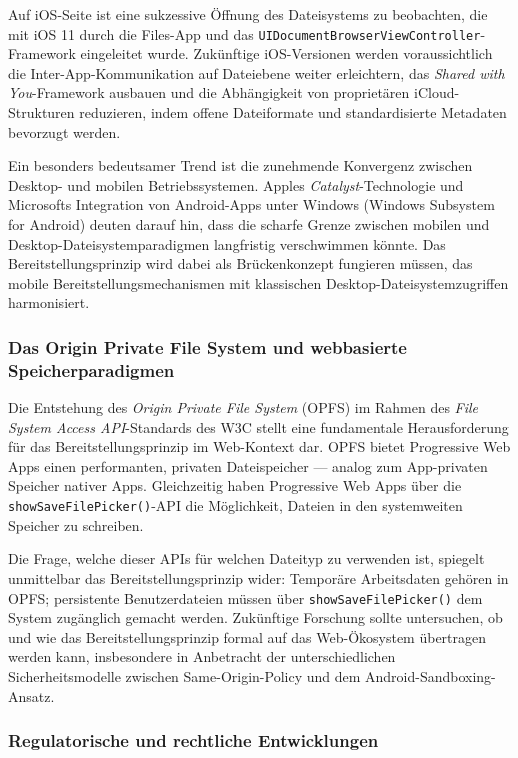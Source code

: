 ﻿\documentclass[12pt, a4paper]{article}
\begin{document}
Auf iOS-Seite ist eine sukzessive Öffnung des Dateisystems zu beobachten, die mit iOS 11
durch die Files-App und das \texttt{UIDocumentBrowserViewController}-Framework eingeleitet
wurde. Zukünftige iOS-Versionen werden voraussichtlich die Inter-App-Kommunikation auf
Dateiebene weiter erleichtern, das \emph{Shared with You}-Framework ausbauen und die
Abhängigkeit von proprietären iCloud-Strukturen reduzieren, indem offene Dateiformate und
standardisierte Metadaten bevorzugt werden.

Ein besonders bedeutsamer Trend ist die zunehmende Konvergenz zwischen Desktop- und
mobilen Betriebssystemen. Apples \emph{Catalyst}-Technologie und Microsofts Integration
von Android-Apps unter Windows (Windows Subsystem for Android) deuten darauf hin, dass
die scharfe Grenze zwischen mobilen und Desktop-Dateisystemparadigmen langfristig
verschwimmen könnte. Das Bereitstellungsprinzip wird dabei als Brückenkonzept fungieren
müssen, das mobile Bereitstellungsmechanismen mit klassischen Desktop-Dateisystemzugriffen
harmonisiert.

\subsubsection{Das Origin Private File System und webbasierte Speicherparadigmen}

Die Entstehung des \emph{Origin Private File System} (OPFS) im Rahmen des
\emph{File System Access API}-Standards des W3C stellt eine fundamentale Herausforderung
für das Bereitstellungsprinzip im Web-Kontext dar. OPFS bietet Progressive Web Apps einen
performanten, privaten Dateispeicher --- analog zum App-privaten Speicher nativer Apps.
Gleichzeitig haben Progressive Web Apps über die \texttt{showSaveFilePicker()}-API die
Möglichkeit, Dateien in den systemweiten Speicher zu schreiben.

Die Frage, welche dieser APIs für welchen Dateityp zu verwenden ist, spiegelt unmittelbar
das Bereitstellungsprinzip wider: Temporäre Arbeitsdaten gehören in OPFS; persistente
Benutzerdateien müssen über \texttt{showSaveFilePicker()} dem System zugänglich gemacht
werden. Zukünftige Forschung sollte untersuchen, ob und wie das Bereitstellungsprinzip
formal auf das Web-Ökosystem übertragen werden kann, insbesondere in Anbetracht der
unterschiedlichen Sicherheitsmodelle zwischen Same-Origin-Policy und dem
Android-Sandboxing-Ansatz.

\subsubsection{Regulatorische und rechtliche Entwicklungen}
\end{document}
